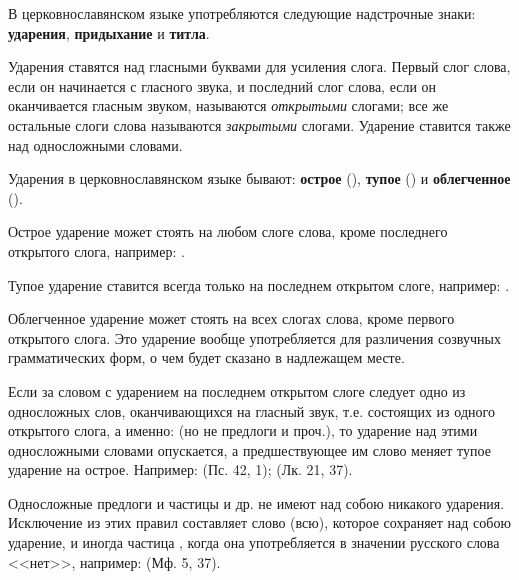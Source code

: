 \documentclass[11pt,a4paper,oneside]{memoir}
\newcommand{\mockitem}[1]{{\mock{#1}}}
\begin{document}
        В церковнославянском языке употребляются следующие
        надстрочные знаки: \textbf{ударения}, \textbf{придыхание} и
        \textbf{титла}.

        \bigskip
        \mockitem{1. Ударения}
        \medskip

        Ударения ставятся над гласными буквами для усиления слога.
        Первый слог слова, если он начинается с гласного звука, и
        последний слог слова, если он оканчивается гласным звуком,
        называются \emph{открытыми} слогами; все же остальные слоги
        слова называются \emph{закрытыми} слогами. Ударение ставится
        также над односложными словами.

        Ударения в церковнославянском языке бывают: \textbf{острое}
        ({}), \textbf{тупое} ({}) и
        \textbf{облегченное} ({}).

        Острое ударение может стоять на любом слоге слова, кроме
        последнего открытого слога, например: {}.

        Тупое ударение ставится всегда только на последнем открытом
        слоге, например: {}.

        Облегченное ударение может стоять на всех слогах слова, кроме
        первого открытого слога. Это ударение вообще употребляется
        для различения созвучных грамматических форм, о чем будет
        сказано в надлежащем месте.

        Если за словом с ударением на последнем открытом слоге
        следует одно из односложных слов, оканчивающихся на гласный
        звук, т.е. состоящих из одного открытого слога, а именно:
        {} (но не
        предлоги {} и проч.), то ударение над
        этими односложными словами опускается, а предшествующее им
        слово меняет тупое ударение на острое. Например: {} (Пс. 42, 1); {} (Лк. 21, 37).

        Односложные предлоги и частицы {} и др. не имеют над собою
        никакого ударения. Исключение из этих правил составляет слово
        {} (всю), которое сохраняет над собою ударение, и
        иногда частица {}, когда она употребляется в значении
        русского слова <<нет>>, например: {} (Мф. 5, 37).
\end{document}
